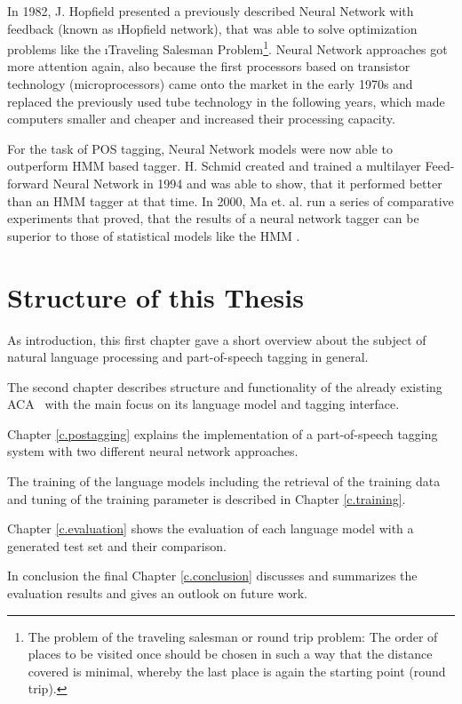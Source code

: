 In 1982, J. Hopfield presented a previously described Neural Network with feedback (known as \i{Hopfield network}), that was able to solve optimization problems like the \i{Traveling Salesman Problem}\footnote{The problem of the traveling salesman or round trip problem: The order of places to be visited once should be chosen in such a way that the distance covered is minimal, whereby the last place is again the starting point (round trip).}. Neural Network approaches got more attention again, also because the first processors based on transistor technology (microprocessors) came onto the market in the early 1970s and replaced the previously used tube technology in the following years, which made computers smaller and cheaper and increased their processing capacity.

For the task of POS tagging, Neural Network models were now able to outperform HMM based tagger. H. Schmid created and trained a multilayer Feed-forward Neural Network in 1994 and was able to show, that it performed better than an HMM tagger \cite{schmid1994} at that time. In 2000, Ma et. al. run a series of comparative experiments that proved, that the results of a neural network tagger can be superior to those of statistical models like the HMM \cite{ma2000}.

\section{Structure of this Thesis}\label{c.introduction.structure}
As introduction, this first chapter gave a short overview about the subject of natural language processing and part-of-speech tagging in general.

The second chapter describes structure and functionality of the already existing ACA \Alex\ with the main focus on its language model and tagging interface.

Chapter \ref{c.postagging} explains the implementation of a part-of-speech tagging system with two different neural network approaches.

The training of the language models including the retrieval of the training data and tuning of the training parameter is described in Chapter \ref{c.training}.

Chapter \ref{c.evaluation} shows the evaluation of each language model with a generated test set and their comparison.

In conclusion the final Chapter \ref{c.conclusion} discusses and summarizes the evaluation results and gives an outlook on future work.

